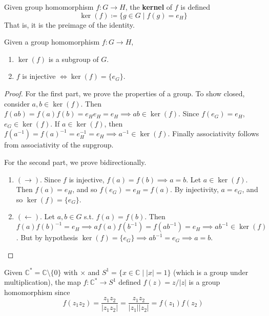   \begin{definition}[Kernel]
    Given group homomorphism $f: G \rightarrow H$, the \textbf{kernel} of $f$ is defined 
    \begin{equation}
      \ker(f) \coloneqq \{g \in G \mid f(g) = e_H\}
    \end{equation}
    That is, it is the preimage of the identity. 
  \end{definition} 

  \begin{theorem}
    Given a group homomorphism $f: G \rightarrow H$, 
    \begin{enumerate}
      \item $\ker(f)$ is a subgroup of $G$.  
      \item $f$ is injective $\iff \ker(f) = \{e_G\}$. 
    \end{enumerate}
  \end{theorem}
  \begin{proof}
    For the first part, we prove the properties of a group. To show closed, consider $a, b \in \ker(f)$. Then $f(ab) = f(a) f(b) = e_H e_H = e_H \implies ab \in \ker(f)$. Since $f(e_G) = e_H$, $e_G \in \ker(f)$. If $a \in \ker(f)$, then $f(a^{-1}) = f(a)^{-1} = e_H^{-1} = e_H \implies a^{-1} \in \ker(f)$. Finally associativity follows from associativity of the supgroup. 

    For the second part, we prove bidirectionally. 
    \begin{enumerate}
      \item $(\rightarrow)$. Since $f$ is injective, $f(a) = f(b) \implies a = b$. Let $a \in \ker(f)$. Then $f(a) = e_H$, and so $f(e_G) = e_H = f(a)$. By injectivity, $a = e_G$, and so $\ker(f) = \{e_G\}$. 
      \item $(\leftarrow)$. Let $a, b \in G$ s.t. $f(a) = f(b)$. Then $f(a) f(b)^{-1} = e_H \implies af(a) f(b^{-1}) = f(a b^{-1}) = e_H \implies ab^{-1} \in \ker(f)$. But by hypothesis $\ker(f) = \{e_G\} \implies ab^{-1} = e_G \implies a = b$. 
    \end{enumerate}
  \end{proof}

  \begin{example}
    Given $\mathbb{C}^\ast = \mathbb{C} \setminus \{0\}$ with $\times$ and $S^1 = \{x \in \mathbb{C} \mid |x| = 1\}$ (which is a group under multiplication), the map $f: \mathbb{C}^\ast \rightarrow S^1$ defined $f(z) = z/|z|$ is a group homomorphism since 
    \begin{equation}
      f(z_1 z_2) = \frac{z_1 z_2}{|z_1 z_2|} = \frac{z_1 z_2}{|z_1| |z_2|} = f(z_1) f(z_2)
    \end{equation}
  \end{example} 

